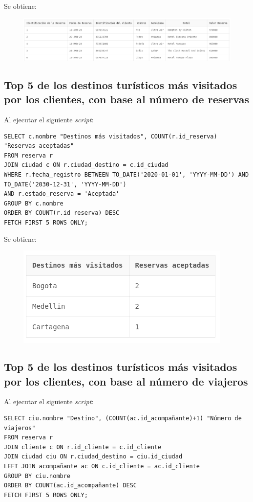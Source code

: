 \documentclass{article}
\begin{document}
Se obtiene:

\begin{figure}[h]
    \centering
    \includegraphics[width=1\linewidth]{img/Consulta_2.png}
\end{figure}

\newpage


\subsection{Top 5 de los destinos turísticos más visitados por los clientes, con base al número de reservas}
Al ejecutar el siguiente \textit{script}:
\begin{lstlisting}
SELECT c.nombre "Destinos más visitados", COUNT(r.id_reserva) "Reservas aceptadas"
FROM reserva r
JOIN ciudad c ON r.ciudad_destino = c.id_ciudad
WHERE r.fecha_registro BETWEEN TO_DATE('2020-01-01', 'YYYY-MM-DD') AND TO_DATE('2030-12-31', 'YYYY-MM-DD')
AND r.estado_reserva = 'Aceptada'
GROUP BY c.nombre
ORDER BY COUNT(r.id_reserva) DESC
FETCH FIRST 5 ROWS ONLY;
\end{lstlisting}

Se obtiene:

\begin{figure}[h]
    \centering
    \includegraphics[width=0.75\linewidth]{img/Consulta_3.png}
\end{figure}


\newpage


\subsection{Top 5 de los destinos turísticos más visitados por los clientes, con base al número de viajeros}
Al ejecutar el siguiente \textit{script}:
\begin{lstlisting}
SELECT ciu.nombre "Destino", (COUNT(ac.id_acompañante)+1) "Número de viajeros"
FROM reserva r
JOIN cliente c ON r.id_cliente = c.id_cliente
JOIN ciudad ciu ON r.ciudad_destino = ciu.id_ciudad
LEFT JOIN acompañante ac ON c.id_cliente = ac.id_cliente
GROUP BY ciu.nombre
ORDER BY COUNT(ac.id_acompañante) DESC
FETCH FIRST 5 ROWS ONLY;
\end{lstlisting}
\end{document}
